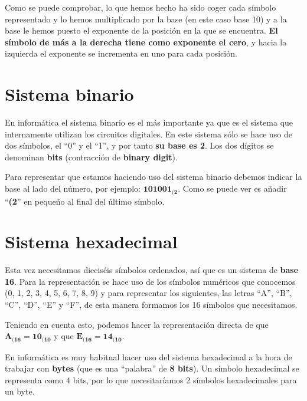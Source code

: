 Como se puede comprobar, lo que hemos hecho ha sido coger cada símbolo representado y lo hemos multiplicado por la base (en este caso base 10) y a la base le hemos puesto el exponente de la posición en la que se encuentra. \textbf{El símbolo de más a la derecha tiene como exponente el cero}, y hacia la izquierda el exponente se incrementa en uno para cada posición.


\hypertarget{binario}{}
\section{Sistema binario}

En informática el sistema binario es el más importante ya que es el sistema que internamente utilizan los circuitos digitales. En este sistema sólo se hace uso de dos símbolos, el “0” y el “1”, y por tanto \textbf{su base es 2}. Los dos dígitos se denominan \textbf{bits} (contracción de \textbf{binary digit}).


Para representar que estamos haciendo uso del sistema binario debemos indicar la base al lado del número, por ejemplo: $\mathbf{ 101001_{(2}} $. Como se puede ver es añadir “\textbf{(2}” en pequeño al final del último símbolo.


\section{Sistema hexadecimal}

Esta vez necesitamos dieciséis símbolos ordenados, así que es un sistema de \textbf{base 16}. Para la representación se hace uso de los símbolos numéricos que conocemos (0, 1, 2, 3, 4, 5, 6, 7, 8, 9) y para representar los siguientes, las letras “A”, “B”, “C”, “D”, “E” y “F”, de esta manera formamos los 16 símbolos que necesitamos.

Teniendo en cuenta esto, podemos hacer la representación directa de que $\mathbf{A_{(16} = 10_{(10}}$ y que $\mathbf{E_{(16} = 14_{(10}}$.

En informática es muy habitual hacer uso del sistema hexadecimal a la hora de trabajar con \textbf{bytes} (que es una “palabra” de \textbf{8 bits}). Un símbolo hexadecimal se representa como 4 bits, por lo que necesitaríamos 2 símbolos hexadecimales para un byte.

